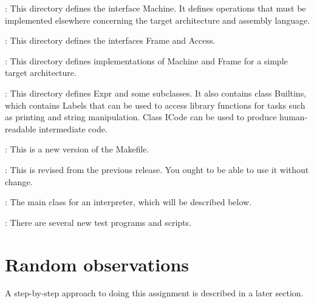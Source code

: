 \documentclass[11pt]{article}
\begin{document}
\mbox{}\par{}:  This directory defines the interface Machine.  It defines operations that must be implemented elsewhere concerning the target architecture and assembly language.

\mbox{}\par{}:  This directory defines the interfaces Frame and Access.

\mbox{}\par{}:  This directory defines implementations of Machine and Frame for a simple target architecture.

\mbox{}\par{}:  This directory defines Expr and some subclasses.  It also contains class Builtins, which contains Labels that can be used to access library functions for tasks such as printing and string manipulation.  Class ICode can be used to produce human-readable intermediate code. 

\mbox{}\par{}:  This is a new version of the Makefile.

\mbox{}\par{}:  This is revised from the previous release.  You ought to be able to use it without change.

\mbox{}\par{}:  The main class for an interpreter, which will be described below.

\mbox{}\par{}:  There are several new test programs and scripts.

\section{Random observations}
A step-by-step approach to doing this assignment is described in a later section.
\end{document}
